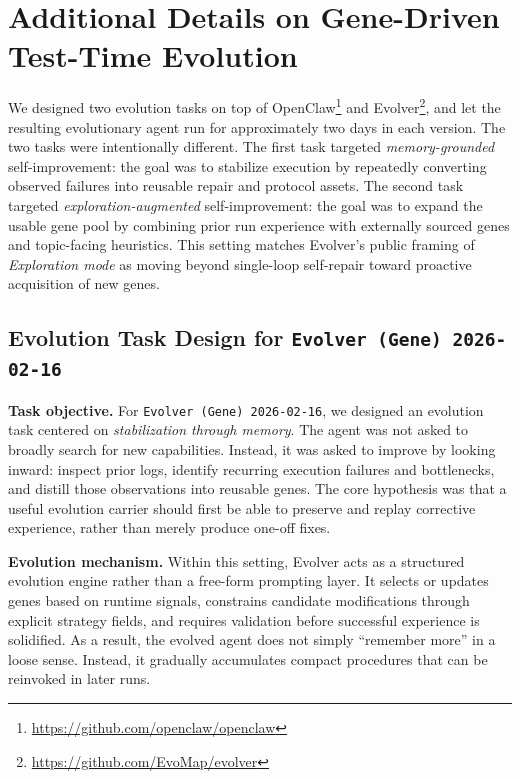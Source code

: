 \documentclass{article}
\newcommand{\nbf}[1]{{\noindent \textbf{#1}}}
\begin{document}
\section{Additional Details on Gene-Driven Test-Time Evolution}
\label{app:critpt_evolution_details}

We designed two evolution tasks on top of OpenClaw\footnote{\url{https://github.com/openclaw/openclaw}} and Evolver\footnote{\url{https://github.com/EvoMap/evolver}}, and let the resulting evolutionary agent run for approximately two days in each version.
The two tasks were intentionally different.
The first task targeted \emph{memory-grounded} self-improvement: the goal was to stabilize execution by repeatedly converting observed failures into reusable repair and protocol assets.
The second task targeted \emph{exploration-augmented} self-improvement: the goal was to expand the usable gene pool by combining prior run experience with externally sourced genes and topic-facing heuristics.
This setting matches Evolver's public framing of \emph{Exploration mode} as moving beyond single-loop self-repair toward proactive acquisition of new genes.

\subsection{Evolution Task Design for \texttt{Evolver (Gene) 2026-02-16}}
\label{app:first_run_design}

\nbf{Task objective.}
For \texttt{Evolver (Gene) 2026-02-16}, we designed an evolution task centered on \emph{stabilization through memory}.
The agent was not asked to broadly search for new capabilities.
Instead, it was asked to improve by looking inward: inspect prior logs, identify recurring execution failures and bottlenecks, and distill those observations into reusable genes.
The core hypothesis was that a useful evolution carrier should first be able to preserve and replay corrective experience, rather than merely produce one-off fixes.

\nbf{Evolution mechanism.}
Within this setting, Evolver acts as a structured evolution engine rather than a free-form prompting layer.
It selects or updates genes based on runtime signals, constrains candidate modifications through explicit strategy fields, and requires validation before successful experience is solidified.
As a result, the evolved agent does not simply ``remember more'' in a loose sense.
Instead, it gradually accumulates compact procedures that can be reinvoked in later runs.
\end{document}
